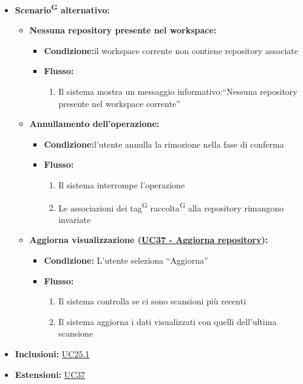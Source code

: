 \documentclass[a4paper, 11pt]{article}
\begin{document}
\begin{itemize}
	\item \textbf{Scenario\textsuperscript{G} alternativo:}
	\begin{itemize}
		\item \textbf{Nessuna repository presente nel workspace:}
			\begin{itemize}
				\item \textbf{Condizione:}il workspace corrente non contiene repository associate
				\item \textbf{Flusso:}
				\begin{enumerate}
					\item Il sistema mostra un messaggio informativo:“Nessuna repository presente nel workspace corrente”
				\end{enumerate}
			\end{itemize}
        \item \textbf{Annullamento dell'operazione:}
		\begin{itemize}
			\item \textbf{Condizione:}l'utente annulla la rimozione nella fase di conferma
			\item \textbf{Flusso:}
			\begin{enumerate}
				\item Il sistema interrompe l'operazione
				\item Le associazioni dei tag\textsuperscript{G} raccolta\textsuperscript{G} alla repository rimangono invariate
			\end{enumerate}
		\end{itemize}
		\item \textbf{Aggiorna visualizzazione (\hyperref[UC37]{UC37 - Aggiorna repository}):}
        \begin{itemize}
            \item \textbf{Condizione:} L'utente seleziona “Aggiorna”
            \item \textbf{Flusso:}
            \begin{enumerate}
                \item Il sistema controlla se ci sono scansioni più recenti
                \item Il sistema aggiorna i dati visualizzati con quelli dell'ultima scansione
            \end{enumerate}
        \end{itemize}
	\end{itemize}
	\item \textbf{Inclusioni:} \hyperref[UC25.1]{UC25.1}
	\item \textbf{Estensioni:} \hyperref[UC37]{UC37}
\end{itemize}
\end{document}
